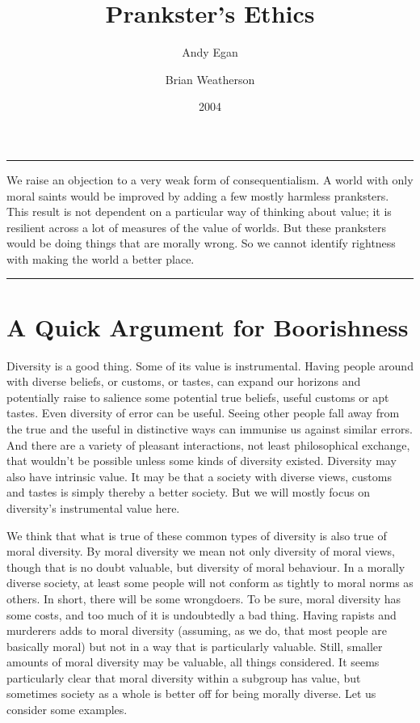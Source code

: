 \documentclass[
  10pt,
  letterpaper,
  DIV=11,
  numbers=noendperiod,
  twoside]{scrartcl}
\title{Prankster's Ethics}
\author{Andy Egan \and Brian Weatherson}
\date{2004}
\renewenvironment{abstract}
 {\vspace{-1.25cm}
 \quotation\small\noindent\rule{\linewidth}{.5pt}\par\smallskip
 \noindent }
 {\par\noindent\rule{\linewidth}{.5pt}\endquotation}
\begin{document}
\maketitle
\begin{abstract}
We raise an objection to a very weak form of consequentialism. A world
with only moral saints would be improved by adding a few mostly harmless
pranksters. This result is not dependent on a particular way of thinking
about value; it is resilient across a lot of measures of the value of
worlds. But these pranksters would be doing things that are morally
wrong. So we cannot identify rightness with making the world a better
place.
\end{abstract}

\section{A Quick Argument for
Boorishness}\label{a-quick-argument-for-boorishness}

Diversity is a good thing. Some of its value is instrumental. Having
people around with diverse beliefs, or customs, or tastes, can expand
our horizons and potentially raise to salience some potential true
beliefs, useful customs or apt tastes. Even diversity of error can be
useful. Seeing other people fall away from the true and the useful in
distinctive ways can immunise us against similar errors. And there are a
variety of pleasant interactions, not least philosophical exchange, that
wouldn't be possible unless some kinds of diversity existed. Diversity
may also have intrinsic value. It may be that a society with diverse
views, customs and tastes is simply thereby a better society. But we
will mostly focus on diversity's instrumental value here.

We think that what is true of these common types of diversity is also
true of moral diversity. By moral diversity we mean not only diversity
of moral views, though that is no doubt valuable, but diversity of moral
behaviour. In a morally diverse society, at least some people will not
conform as tightly to moral norms as others. In short, there will be
some wrongdoers. To be sure, moral diversity has some costs, and too
much of it is undoubtedly a bad thing. Having rapists and murderers adds
to moral diversity (assuming, as we do, that most people are basically
moral) but not in a way that is particularly valuable. Still, smaller
amounts of moral diversity may be valuable, all things considered. It
seems particularly clear that moral diversity within a subgroup has
value, but sometimes society as a whole is better off for being morally
diverse. Let us consider some examples.
\end{document}
